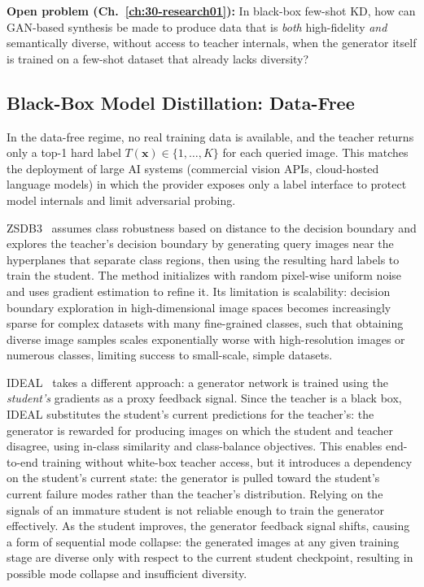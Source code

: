 \begin{foldable}
  \textbf{Open problem (Ch.~\ref{ch:30-research01}):}
  In black-box few-shot \ac{KD}, how can GAN-based synthesis be made to produce data that is \textit{both} high-fidelity \textit{and} semantically diverse, without access to teacher internals, when the generator itself is trained on a few-shot dataset that already lacks diversity?
\end{foldable}

\subsection{Black-Box Model Distillation: Data-Free} \label{sec:24-background-kdrestricted-bbdatafree}
\begin{foldable}
  In the data-free regime, no real training data is available, and the teacher returns only a top-1 hard label $T(\mathbf{x}) \in \{1, \ldots, K\}$ for each queried image.
  This matches the deployment of large \ac{AI} systems (commercial vision \acp{API}, cloud-hosted language models) in which the provider exposes only a label interface to protect model internals and limit adversarial probing.
\end{foldable}

\begin{foldable}
  ZSDB3~\cite{wang2021zero} assumes class robustness based on distance to the decision boundary and explores the teacher's decision boundary by generating query images near the hyperplanes that separate class regions, then using the resulting hard labels to train the student.
  The method initializes with random pixel-wise uniform noise and uses gradient estimation to refine it.
  Its limitation is scalability: decision boundary exploration in high-dimensional image spaces becomes increasingly sparse for complex datasets with many fine-grained classes, such that obtaining diverse image samples scales exponentially worse with high-resolution images or numerous classes, limiting success to small-scale, simple datasets.
\end{foldable}

\begin{foldable}
  IDEAL~\cite{zhang2022ideal} takes a different approach: a generator network is trained using the \textit{student's} gradients as a proxy feedback signal.
  Since the teacher is a black box, IDEAL substitutes the student's current predictions for the teacher's: the generator is rewarded for producing images on which the student and teacher disagree, using in-class similarity and class-balance objectives.
  This enables end-to-end training without white-box teacher access, but it introduces a dependency on the student's current state: the generator is pulled toward the student's current failure modes rather than the teacher's distribution.
  Relying on the signals of an immature student is not reliable enough to train the generator effectively.
  As the student improves, the generator feedback signal shifts, causing a form of sequential mode collapse: the generated images at any given training stage are diverse only with respect to the current student checkpoint, resulting in possible mode collapse and insufficient diversity.
\end{foldable}


